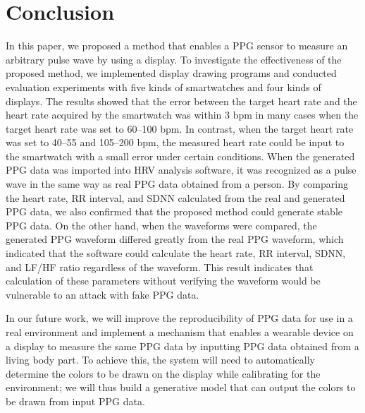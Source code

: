 \documentclass[sigchi,authordraft]{acmart}
\begin{document}
\section{Conclusion}
\label{sec:conclusion}
In this paper, we proposed a method that enables a PPG sensor to measure an arbitrary pulse wave by using a display. To investigate the effectiveness of the proposed method, we implemented display drawing programs and conducted evaluation experiments with five kinds of smartwatches and four kinds of displays. The results showed that the error between the target heart rate and the heart rate acquired by the smartwatch was within $3$ bpm in many cases when the target heart rate was set to 60--100 bpm. In contrast, when the target heart rate was set to 40--55 and 105--200 bpm, the measured heart rate could be input to the smartwatch with a small error under certain conditions. When the generated PPG data was imported into HRV analysis software, it was recognized as a pulse wave in the same way as real PPG data obtained from a person. By comparing the heart rate, RR interval, and SDNN calculated from the real and generated PPG data, we also confirmed that the proposed method could generate stable PPG data. On the other hand, when the waveforms were compared, the generated PPG waveform differed greatly from the real PPG waveform, which indicated that the software could calculate the heart rate, RR interval, SDNN, and LF/HF ratio regardless of the waveform. This result indicates that calculation of these parameters without verifying the waveform would be vulnerable to an attack with fake PPG data.\par

In our future work, we will improve the reproducibility of PPG data for use in a real environment and implement a mechanism that enables a wearable device on a display to measure the same PPG data by inputting PPG data obtained from a living body part. To achieve this, the system will need to automatically determine the colors to be drawn on the display while calibrating for the environment; we will thus build a generative model that can output the colors to be drawn from input PPG data.




\end{document}
